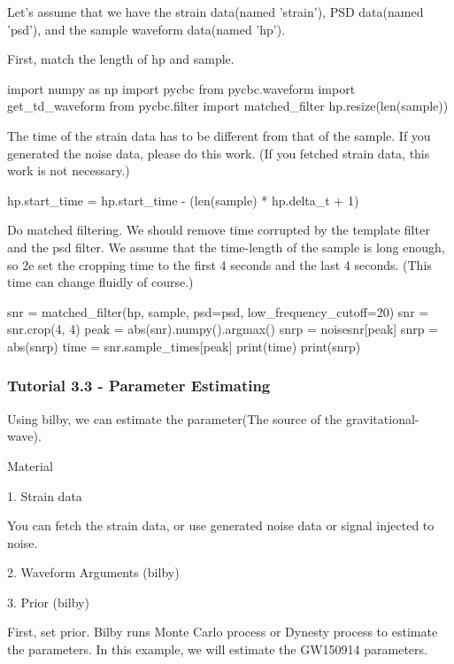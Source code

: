 Let's assume that we have the strain data(named 'strain'), PSD data(named 'psd'), and the sample waveform data(named 'hp').

First, match the length of hp and sample.

\begin{python}[python3]
    import numpy as np
    import pycbc
    from pycbc.waveform import get_td_waveform
    from pycbc.filter import matched_filter
    hp.resize(len(sample))
\end{python}

The time of the strain data has to be different from that of the sample. If you generated the noise data, please do this work. (If you fetched strain data, this work is not necessary.)

\begin{python}[python3]
    hp.start_time = hp.start_time - (len(sample) * hp.delta_t + 1)
\end{python}

Do matched filtering. We should remove time corrupted by the template filter and the psd filter. We assume that the time-length of the sample is long enough, so 2e set the cropping time to the first 4 seconds and the last 4 seconds. (This time can change fluidly of course.)

\begin{python}
    snr = matched_filter(hp,
                         sample,
                         psd=psd,
                         low_frequency_cutoff=20)
    snr = snr.crop(4, 4)
    peak = abs(snr).numpy().argmax()
    snrp = noisesnr[peak]
    snrp = abs(snrp)
    time = snr.sample_times[peak]
    print(time)
    print(snrp)
\end{python}

\subsubsection{Tutorial 3.3 - Parameter Estimating}

Using bilby, we can estimate the parameter(The source of the gravitational-wave).

Material

1. Strain data

You can fetch the strain data, or use generated noise data or signal injected to noise.

2. Waveform Arguments (bilby)

3. Prior (bilby)

First, set prior. Bilby runs Monte Carlo process or Dynesty process to estimate the parameters. In this example, we will estimate the GW150914 parameters.

